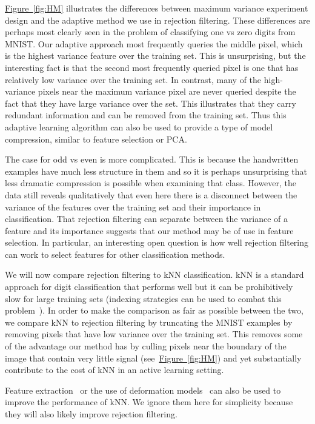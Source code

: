 \documentclass[twoside]{article}
\newcommand{\fig}[1]{\hyperref[fig:#1]{Figure~\ref*{fig:#1}}}
\begin{document}
\fig{HM} illustrates the differences between maximum variance experiment design and the adaptive method we use in rejection filtering.  These differences
are perhaps most clearly seen in the problem of classifying one vs zero digits from MNIST.  Our adaptive approach most frequently queries the middle pixel, which is the 
highest variance feature over the training set.  This is unsurprising, but the interesting fact is that the second most frequently queried pixel is one that has relatively low variance
over the training set.  In contrast, many of the high-variance pixels near the maximum variance pixel are never queried despite the fact that they have large variance over the set.
This illustrates that they carry redundant information and can be removed from the training set.  Thus this adaptive learning algorithm can also be used to provide a type of model compression, similar to feature selection
or PCA.

The case for odd vs even is more complicated.  This is because the handwritten examples have much less structure in them and so it is perhaps unsurprising that less dramatic compression is possible when examining that class. However, the data still reveals qualitatively that even here there is a disconnect between the variance of the features over the training set and their importance in classification.
That rejection filtering can separate between the variance of a feature and
its importance suggests that our method may be of use in feature selection.
In particular, an interesting open question is how well rejection filtering
can work to select features for other classification methods.

We will now compare rejection filtering to kNN classification.  kNN is a standard approach for digit classification that performs well but it can be prohibitively slow for
large training sets \cite{yu2010high} (indexing strategies can be used to combat this problem~\cite{yu2001indexing}).  In order to make the comparison as fair as possible between the two, we compare kNN to rejection filtering by truncating the 
MNIST examples by removing pixels that have low variance over the training set.  This removes some of the advantage our method has by culling pixels near
the boundary of the image that contain very little signal  (see~\fig{HM}) and yet substantially contribute to the cost of kNN in an active learning setting.

Feature extraction~\cite{zhang2006svm,weinberger2008fast,min2009deep} or the use of 
deformation models~\cite{keysers2007deformation} can also be used to improve the performance of kNN.
We ignore them here for simplicity because they will also likely improve rejection filtering.
\end{document}
